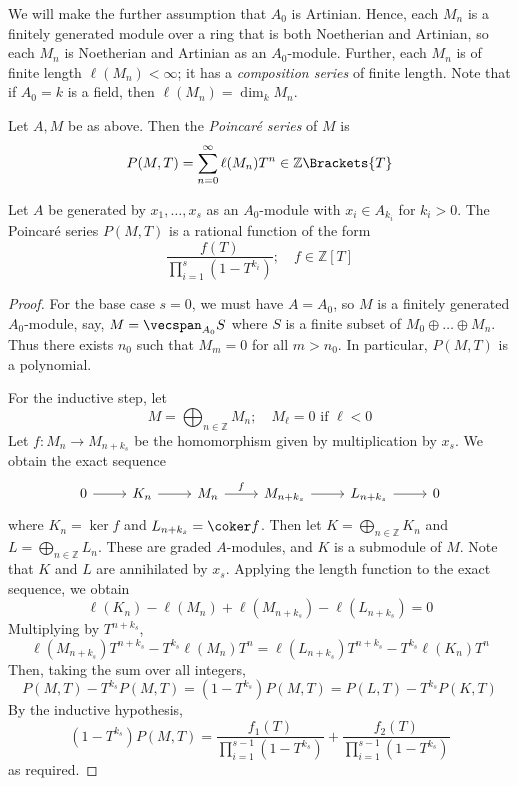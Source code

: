 We will make the further assumption that \( A_0 \) is Artinian.
Hence, each \( M_n \) is a finitely generated module over a ring that is both Noetherian and Artinian, so each \( M_n \) is Noetherian and Artinian as an \( A_0 \)-module.
Further, each \( M_n \) is of finite length \( \ell(M_n) < \infty \); it has a \emph{composition series} of finite length.
Note that if \( A_0 = k \) is a field, then \( \ell(M_n) = \dim_k M_n \).
\begin{definition}
    Let \( A, M \) be as above.
    Then the \emph{Poincar\'e series} of \( M \) is
    \[ P(M, T) = \sum_{n=0}^\infty \ell(M_n) T^n \in \mathbb Z\Brackets{T} \]
\end{definition}
\begin{theorem}
    Let \( A \) be generated by \( x_1, \dots, x_s \) as an \( A_0 \)-module with \( x_i \in A_{k_i} \) for \( k_i > 0 \).
    The Poincar\'e series \( P(M, T) \) is a rational function of the form
    \[ \frac{f(T)}{\prod_{i=1}^s (1 - T^{k_i})};\quad f \in \mathbb Z[T] \]
\end{theorem}
\begin{proof}
    For the base case \( s = 0 \), we must have \( A = A_0 \), so \( M \) is a finitely generated \( A_0 \)-module, say, \( M = \vecspan_{A_0} S \) where \( S \) is a finite subset of \( M_0 \oplus \dots \oplus M_n \).
    Thus there exists \( n_0 \) such that \( M_m = 0 \) for all \( m > n_0 \).
    In particular, \( P(M, T) \) is a polynomial.

    For the inductive step, let
    \[ M = \bigoplus_{n \in \mathbb Z} M_n;\quad M_\ell = 0 \text{ if } \ell < 0 \]
    Let \( f : M_n \to M_{n+k_s} \) be the homomorphism given by multiplication by \( x_s \).
    We obtain the exact sequence
\[\begin{tikzcd}
	0 & {K_n} & {M_n} & {M_{n+k_s}} & {L_{n+k_s}} & 0
	\arrow["f", from=1-3, to=1-4]
	\arrow[from=1-4, to=1-5]
	\arrow[from=1-5, to=1-6]
	\arrow[from=1-1, to=1-2]
	\arrow[from=1-2, to=1-3]
\end{tikzcd}\]
    where \( K_n = \ker f \) and \( L_{n+k_s} = \coker f \).
    Then let \( K = \bigoplus_{n \in \mathbb Z} K_n \) and \( L = \bigoplus_{n \in \mathbb Z} L_n \).
    These are graded \( A \)-modules, and \( K \) is a submodule of \( M \).
    Note that \( K \) and \( L \) are annihilated by \( x_s \).
    Applying the length function to the exact sequence, we obtain
    \[ \ell(K_n) - \ell(M_n) + \ell(M_{n+k_s}) - \ell(L_{n+k_s}) = 0 \]
    Multiplying by \( T^{n+k_s} \),
    \[ \ell(M_{n+k_s}) T^{n+k_s} - T^{k_s}\ell(M_n) T^n = \ell(L_{n+k_s}) T^{n+k_s} - T^{k_s}\ell(K_n) T^n \]
    Then, taking the sum over all integers,
    \[ P(M, T) - T^{k_s} P(M, T) = (1 - T^{k_s}) P(M, T) = P(L, T) - T^{k_s} P(K, T) \]
    By the inductive hypothesis,
    \[ (1 - T^{k_s}) P(M, T) = \frac{f_1(T)}{\prod_{i=1}^{s-1} (1 - T^{k_s})} + \frac{f_2(T)}{\prod_{i=1}^{s-1} (1 - T^{k_s})} \]
    as required.
\end{proof}
